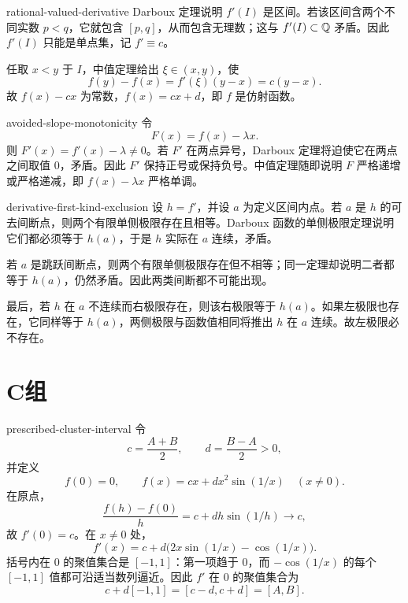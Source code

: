 \begin{solution}{rational-valued-derivative}
Darboux 定理说明 \(f'(I)\) 是区间。若该区间含两个不同实数 \(p<q\)，它就包含 \([p,q]\)，从而包含无理数；这与 \(f'(I)\subset\mathbb{Q}\) 矛盾。因此 \(f'(I)\) 只能是单点集，记 \(f'\equiv c\)。

任取 \(x<y\) 于 \(I\)，中值定理给出 \(\xi\in(x,y)\)，使
\[
 f(y)-f(x)=f'(\xi)(y-x)=c(y-x).
\]
故 \(f(x)-cx\) 为常数，\(f(x)=cx+d\)，即 \(f\) 是仿射函数。
\end{solution}

\begin{solution}{avoided-slope-monotonicity}
令
\[
 F(x)=f(x)-\lambda x.
\]
则 \(F'(x)=f'(x)-\lambda\ne0\)。若 \(F'\) 在两点异号，Darboux 定理将迫使它在两点之间取值 \(0\)，矛盾。因此 \(F'\) 保持正号或保持负号。中值定理随即说明 \(F\) 严格递增或严格递减，即 \(f(x)-\lambda x\) 严格单调。
\end{solution}

\begin{solution}{derivative-first-kind-exclusion}
设 \(h=f'\)，并设 \(a\) 为定义区间内点。若 \(a\) 是 \(h\) 的可去间断点，则两个有限单侧极限存在且相等。Darboux 函数的单侧极限定理说明它们都必须等于 \(h(a)\)，于是 \(h\) 实际在 \(a\) 连续，矛盾。

若 \(a\) 是跳跃间断点，则两个有限单侧极限存在但不相等；同一定理却说明二者都等于 \(h(a)\)，仍然矛盾。因此两类间断都不可能出现。

最后，若 \(h\) 在 \(a\) 不连续而右极限存在，则该右极限等于 \(h(a)\)。如果左极限也存在，它同样等于 \(h(a)\)，两侧极限与函数值相同将推出 \(h\) 在 \(a\) 连续。故左极限必不存在。
\end{solution}

\section*{C组}

\begin{solution}{prescribed-cluster-interval}
令
\[
 c=\frac{A+B}{2},
 \qquad
 d=\frac{B-A}{2}>0,
\]
并定义
\[
 f(0)=0,
 \qquad
 f(x)=cx+d x^2\sin(1/x)\quad(x\ne0).
\]
在原点，
\[
 \frac{f(h)-f(0)}h=c+d h\sin(1/h)\longrightarrow c,
\]
故 \(f'(0)=c\)。在 \(x\ne0\) 处，
\[
 f'(x)=c+d\bigl(2x\sin(1/x)-\cos(1/x)\bigr).
\]
括号内在 \(0\) 的聚值集合是 \([-1,1]\)：第一项趋于 \(0\)，而 \(-\cos(1/x)\) 的每个 \([-1,1]\) 值都可沿适当数列逼近。因此 \(f'\) 在 \(0\) 的聚值集合为
\[
 c+d[-1,1]=[c-d,c+d]=[A,B].
\]
\end{solution}

